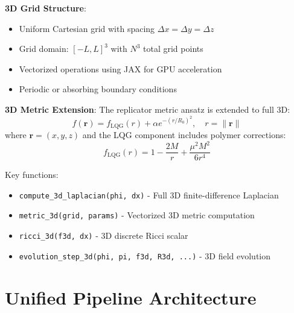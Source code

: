 \documentclass[11pt]{article}
\begin{document}
\textbf{3D Grid Structure}:
\begin{itemize}
\item Uniform Cartesian grid with spacing $\Delta x = \Delta y = \Delta z$
\item Grid domain: $[-L, L]^3$ with $N^3$ total grid points
\item Vectorized operations using JAX for GPU acceleration
\item Periodic or absorbing boundary conditions
\end{itemize}

\textbf{3D Metric Extension}:
The replicator metric ansatz is extended to full 3D:
\begin{equation}
f(\mathbf{r}) = f_{\text{LQG}}(r) + \alpha e^{-(r/R_0)^2}, \quad r = \|\mathbf{r}\|
\end{equation}
where $\mathbf{r} = (x,y,z)$ and the LQG component includes polymer corrections:
\begin{equation}
f_{\text{LQG}}(r) = 1 - \frac{2M}{r} + \frac{\mu^2 M^2}{6r^4}
\end{equation}

Key functions:
\begin{itemize}
\item \texttt{compute\_3d\_laplacian(phi, dx)} - Full 3D finite-difference Laplacian
\item \texttt{metric\_3d(grid, params)} - Vectorized 3D metric computation
\item \texttt{ricci\_3d(f3d, dx)} - 3D discrete Ricci scalar
\item \texttt{evolution\_step\_3d(phi, pi, f3d, R3d, ...)} - 3D field evolution
\end{itemize}

\section{Unified Pipeline Architecture}
\end{document}
